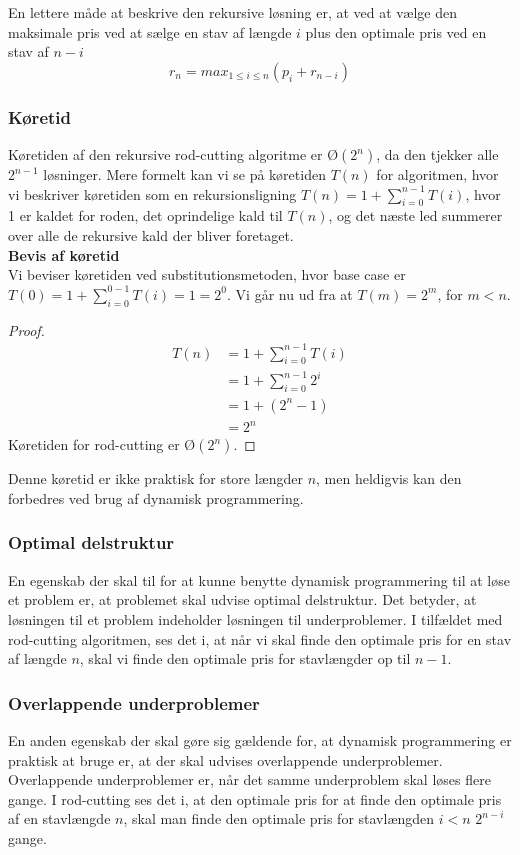 En lettere måde at beskrive den rekursive løsning er, at ved at vælge den maksimale pris ved at sælge en stav af længde $i$ plus den optimale pris ved en stav af $n-i$
$$r_n= max_{1 \leq i \leq n}(p_i + r_{n-i})$$

\subsubsection{Køretid}
Køretiden af den rekursive rod-cutting algoritme er $Ø(2^n)$, da den tjekker alle $2^{n-1}$ løsninger. Mere formelt kan vi se på køretiden $T(n)$ for algoritmen, hvor vi beskriver køretiden som en rekursionsligning $T(n) = 1 + \sum_{i=0}^{n-1}T(i)$, hvor 1 er kaldet for roden, det oprindelige kald til $T(n)$, og det næste led summerer over alle de rekursive kald der bliver foretaget.\\

\textbf{Bevis af køretid}\\
Vi beviser køretiden ved substitutionsmetoden, hvor base case er $T(0) = 1 + \sum_{i=0}^{0-1}T(i) = 1 = 2^0$. Vi går nu ud fra at $T(m) = 2^m$, for $m < n$.
\begin{proof}
\begin{align*}
  T(n) &= 1 + \sum_{i=0}^{n-1} T(i)\\
       &= 1 + \sum_{i=0}^{n-1} 2^i\\
       &= 1 + (2^n - 1)\\
       &= 2^n
\end{align*}
Køretiden for rod-cutting er $Ø(2^n)$.
\end{proof}

Denne køretid er ikke praktisk for store længder $n$, men heldigvis kan den forbedres ved brug af dynamisk programmering.
\subsubsection{Optimal delstruktur}
En egenskab der skal til for at kunne benytte dynamisk programmering til at løse et problem er, at problemet skal udvise optimal delstruktur. Det betyder, at løsningen til et problem indeholder løsningen til underproblemer. I tilfældet med rod-cutting algoritmen, ses det i, at når vi skal finde den optimale pris for en stav af længde $n$, skal vi finde den optimale pris for stavlængder op til $n-1$.

\subsubsection{Overlappende underproblemer}
En anden egenskab der skal gøre sig gældende for, at dynamisk programmering er praktisk at bruge er, at der skal udvises overlappende underproblemer. Overlappende underproblemer er, når det samme underproblem skal løses flere gange. I rod-cutting ses det i, at den optimale pris for at finde den optimale pris af en stavlængde $n$, skal man finde den optimale pris for stavlængden $i < n$ $2^{n-i}$ gange.

